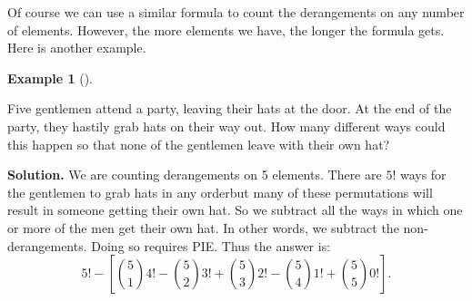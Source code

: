 \documentclass[10pt,]{book}
\theoremstyle{plain}
\theoremstyle{definition}
\newtheorem{example}[theorem]{Example}
\theoremstyle{definition}
\theoremstyle{definition}
\numberwithin{equation}{chapter}
\begin{document}
      Of course we can use a similar formula to count the derangements on any number of elements. However, the more elements we have, the longer the formula gets. Here is another example.
\begin{example}[]\label{example-50}

          Five gentlemen attend a party, leaving their hats at the door. At the end of the party, they hastily grab hats on their way out. How many different ways could this happen so that none of the gentlemen leave with their own hat?
\par\medskip\noindent%
\textbf{Solution.}\quad
          We are counting derangements on 5 elements. There are \(5!\) ways for the gentlemen to grab hats in any order\textemdash{}but many of these permutations will result in someone getting their own hat. So we subtract all the ways in which one or more of the men get their own hat. In other words, we subtract the non-derangements. Doing so requires PIE. Thus the answer is:
          \begin{equation*}
            5! - \left[{5 \choose 1}4! - {5 \choose 2}3! + {5 \choose 3}2! - {5 \choose 4}1! + {5 \choose 5}0!\right].
          \end{equation*}
\end{example}
\typeout{************************************************}
\typeout{************************************************}
\end{document}
